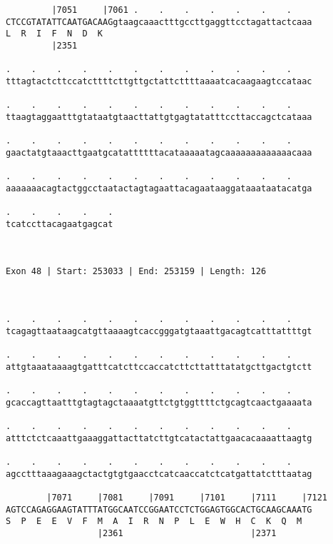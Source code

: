\documentclass{article}
\begin{document}
\begin{Verbatim}
         |7051     |7061 .    .    .    .    .    .    .    
CTCCGTATATTCAATGACAAGgtaagcaaactttgccttgaggttcctagattactcaaa
L  R  I  F  N  D  K                                         
         |2351                                              
  
.    .    .    .    .    .    .    .    .    .    .    .    
tttagtactcttccatcttttcttgttgctattcttttaaaatcacaagaagtccataac
                                                            
.    .    .    .    .    .    .    .    .    .    .    .    
ttaagtaggaatttgtataatgtaacttattgtgagtatatttccttaccagctcataaa
                                                            
.    .    .    .    .    .    .    .    .    .    .    .    
gaactatgtaaacttgaatgcatattttttacataaaaatagcaaaaaaaaaaaaacaaa
                                                            
.    .    .    .    .    .    .    .    .    .    .    .    
aaaaaaacagtactggcctaatactagtagaattacagaataaggataaataatacatga
                                                            
.    .    .    .    .
tcatccttacagaatgagcat
                     
                     
 
Exon 48 | Start: 253033 | End: 253159 | Length: 126



.    .    .    .    .    .    .    .    .    .    .    .    
tcagagttaataagcatgttaaaagtcaccgggatgtaaattgacagtcatttattttgt
                                                            
.    .    .    .    .    .    .    .    .    .    .    .    
attgtaaataaaagtgatttcatcttccaccatcttcttatttatatgcttgactgtctt
                                                            
.    .    .    .    .    .    .    .    .    .    .    .    
gcaccagttaatttgtagtagctaaaatgttctgtggttttctgcagtcaactgaaaata
                                                            
.    .    .    .    .    .    .    .    .    .    .    .    
atttctctcaaattgaaaggattacttatcttgtcatactattgaacacaaaattaagtg
                                                            
.    .    .    .    .    .    .    .    .    .    .    .    
agcctttaaagaaagctactgtgtgaacctcatcaaccatctcatgattatctttaatag
                                                            
        |7071     |7081     |7091     |7101     |7111     |7121
AGTCCAGAGGAAGTATTTATGGCAATCCGGAATCCTCTGGAGTGGCACTGCAAGCAAATG
S  P  E  E  V  F  M  A  I  R  N  P  L  E  W  H  C  K  Q  M  
                  |2361                         |2371       
  

\end{Verbatim}
\end{document}
